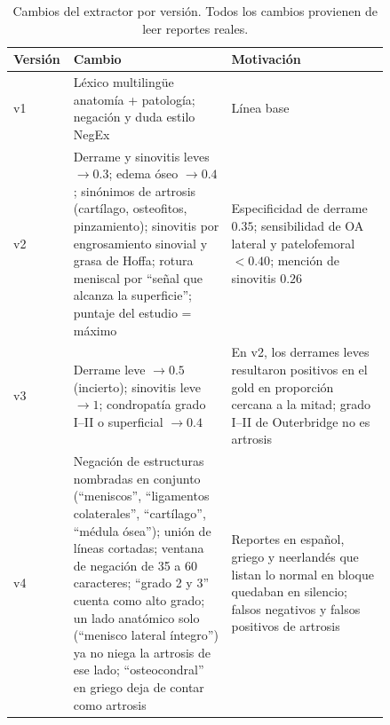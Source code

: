 \begin{table}[t]
  \caption{Cambios del extractor por versión. Todos los cambios provienen de leer reportes reales.}
  \label{tab:ext-cambios}
  \centering
  \small
  \begin{tabular}{@{}lp{0.42\linewidth}p{0.42\linewidth}@{}}
    \toprule
    Versión & Cambio & Motivación \\
    \midrule
    v1 & Léxico multilingüe anatomía + patología; negación y duda estilo NegEx & Línea base \\
    v2 & Derrame y sinovitis leves $\rightarrow 0.3$; edema óseo $\rightarrow 0.4$; sinónimos de artrosis (cartílago, osteofitos, pinzamiento); sinovitis por engrosamiento sinovial y grasa de Hoffa; rotura meniscal por ``señal que alcanza la superficie''; puntaje del estudio = máximo
      & Especificidad de derrame $0.35$; sensibilidad de OA lateral y patelofemoral $<0.40$; mención de sinovitis $0.26$ \\
    v3 & Derrame leve $\rightarrow 0.5$ (incierto); sinovitis leve $\rightarrow 1$; condropatía grado I--II o superficial $\rightarrow 0.4$
      & En v2, los derrames leves resultaron positivos en el gold en proporción cercana a la mitad; grado I--II de Outerbridge no es artrosis \\
    v4 & Negación de estructuras nombradas en conjunto (``meniscos'', ``ligamentos colaterales'', ``cartílago'', ``médula ósea''); unión de líneas cortadas; ventana de negación de 35 a 60 caracteres; ``grado 2 y 3'' cuenta como alto grado; un lado anatómico solo (``menisco lateral íntegro'') ya no niega la artrosis de ese lado; ``osteocondral'' en griego deja de contar como artrosis
      & Reportes en español, griego y neerlandés que listan lo normal en bloque quedaban en silencio; falsos negativos y falsos positivos de artrosis \\
    \bottomrule
  \end{tabular}
\end{table}

